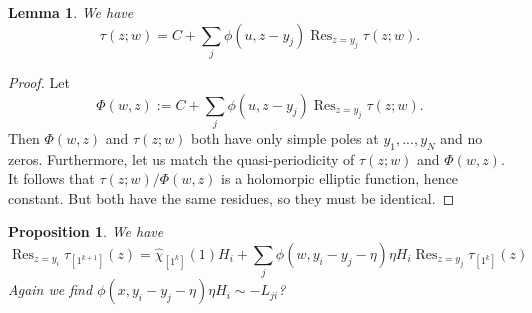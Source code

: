 \documentclass[11pt]{report}
\newtheorem{lemma}[theorem]{Lemma}
\newtheorem{prop}[theorem]{Proposition}
\theoremstyle{definition}
\theoremstyle{remark}
\theoremstyle{remark}
\newcommand{\I}{\mathrm{i}}
\begin{document}
%

\begin{lemma}
We have
\begin{equation*}
\tau(z;w) = C + \sum_j \phi(u,z-y_j) \operatorname{Res}_{z=y_j} \tau(z;w).
\end{equation*}
\end{lemma}

\begin{proof}
Let
\begin{equation*}
\Phi(w,z) := C + \sum_j \phi(u,z-y_j) \operatorname{Res}_{z=y_j} \tau(z;w).
\end{equation*}
Then $\Phi(w,z)$ and $\tau(z;w)$ both have only simple poles at $y_1,...,y_N$ and no zeros. Furthermore, let us match the quasi-periodicity of $\tau(z;w)$ and $\Phi(w,z)$. It follows that $\tau(z;w)/\Phi(w,z)$ is a holomorpic elliptic function, hence constant. But both have the same residues, so they must be identical.
\end{proof}

\begin{prop}
We have
\begin{equation*}
\operatorname{Res}_{z=y_i} \tau_{[1^{k+1}]}(z) = \widehat{\chi}_{[1^k]}(1) H_i + \sum_j \phi(w,y_i-y_j-\eta) \eta H_i \operatorname{Res}_{z=y_j} \tau_{[1^k]}(z)
\end{equation*}
Again we find $\phi(x,y_i-y_j-\eta) \eta H_i \sim -L_{ji}$?
\end{prop}
\end{document}
